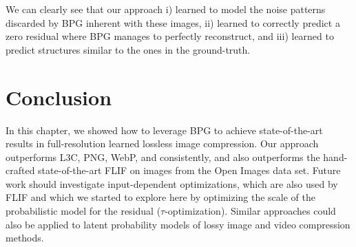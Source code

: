 We can clearly see that our approach  
i) learned to model the noise patterns
discarded by BPG
inherent with these images,
ii) learned to correctly predict a zero residual where BPG manages to perfectly reconstruct, and
iii) learned to predict structures similar to the ones in the ground-truth.

\FloatBarrier

\section{Conclusion}

In this chapter, we showed how to
leverage BPG to achieve
state-of-the-art results in full-resolution learned lossless image compression. Our approach outperforms L3C, PNG, WebP, and \jpegk consistently, and also outperforms the hand-crafted state-of-the-art FLIF on images from the Open Images data set. Future work should investigate input-dependent optimizations, which are also used by FLIF and which we started to explore here by optimizing the scale of the probabilistic model for the residual ($\tau$-optimization). 
%
Similar approaches could also be applied to latent probability models of lossy image and video compression methods.

\clearpage

